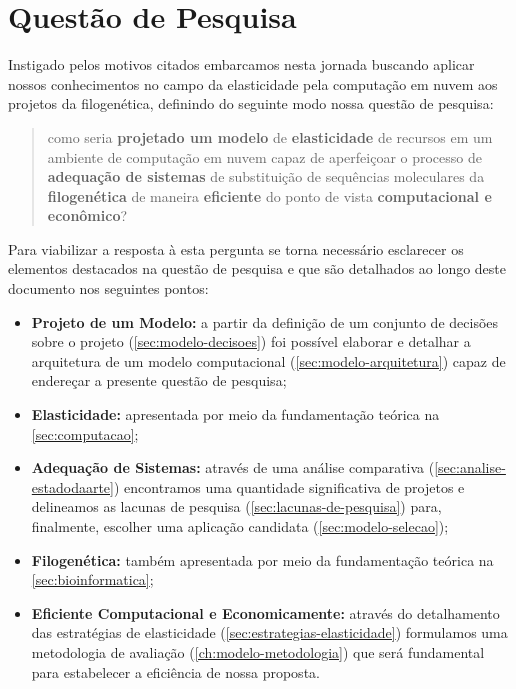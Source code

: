 \documentclass[english,brazilian]{UNISINOSmonografia} %
\begin{document}
\section{Questão de Pesquisa} %


Instigado pelos motivos citados embarcamos nesta jornada buscando aplicar nossos conhecimentos no campo da elasticidade pela computação em nuvem aos projetos da filogenética, definindo do seguinte modo nossa questão de pesquisa:


\begin{quote}
	\large
	como seria \textbf{projetado um modelo} de \textbf{elasticidade} de recursos em um ambiente de computação em nuvem capaz de aperfeiçoar o processo de \textbf{adequação de sistemas} de substituição de sequências moleculares da \textbf{filogenética} de maneira \textbf{eficiente} do ponto de vista \textbf{computacional e econômico}?
	
\end{quote}


Para viabilizar a resposta à esta pergunta se torna necessário esclarecer os elementos destacados na questão de pesquisa e que são detalhados ao longo deste documento nos seguintes pontos:

\begin{itemize}
	
	\item \textbf{Projeto de um Modelo:} a partir da definição de um conjunto de decisões sobre o projeto (\autoref{sec:modelo-decisoes}) foi possível elaborar e detalhar a arquitetura de um modelo computacional (\autoref{sec:modelo-arquitetura}) capaz de endereçar a presente questão de pesquisa;
	
	\item \textbf{Elasticidade:} apresentada por meio da fundamentação teórica na \autoref{sec:computacao};
	
	\item \textbf{Adequação de Sistemas:} através de uma análise comparativa (\autoref{sec:analise-estadodaarte}) encontramos uma quantidade significativa de projetos e delineamos as lacunas de pesquisa (\autoref{sec:lacunas-de-pesquisa}) para, finalmente, escolher uma aplicação candidata (\autoref{sec:modelo-selecao});
	
	\item \textbf{Filogenética:} também apresentada por meio da fundamentação teórica na \autoref{sec:bioinformatica};
	
	\item \textbf{Eficiente Computacional e Economicamente:} através do detalhamento das estratégias de elasticidade (\autoref{sec:estrategias-elasticidade}) formulamos uma metodologia de avaliação (\autoref{ch:modelo-metodologia}) que será fundamental para estabelecer a eficiência de nossa proposta.
\end{itemize}
\end{document}
